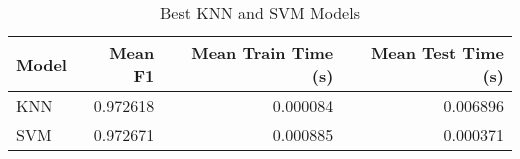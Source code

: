 \begin{table}
\centering
\caption{Best KNN and SVM Models}
\label{tab:best_knn_and_svm_summary_hepatitis}
\begin{tabular}{lrrr}
\toprule
Model & Mean F1 & Mean Train Time (s) & Mean Test Time (s) \\
\midrule
KNN & 0.972618 & 0.000084 & 0.006896 \\
SVM & 0.972671 & 0.000885 & 0.000371 \\
\bottomrule
\end{tabular}
\end{table}
